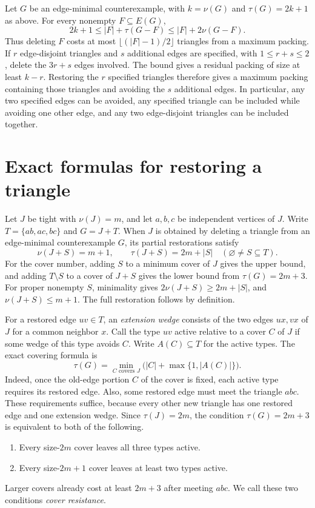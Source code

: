 \documentclass[11pt]{article}
\begin{document}
Let $G$ be an edge-minimal counterexample, with $k=\nu(G)$ and $\tau(G)=2k+1$ as above. For every nonempty $F\subseteq E(G)$,
\[
 2k+1\le |F|+\tau(G-F)\le |F|+2\nu(G-F).
\]
Thus deleting $F$ costs at most $\lfloor (|F|-1)/2\rfloor$ triangles from a maximum packing. If $r$ edge-disjoint triangles and $s$ additional edges are specified, with $1\le r+s\le2$, delete the $3r+s$ edges involved. The bound gives a residual packing of size at least $k-r$. Restoring the $r$ specified triangles therefore gives a maximum packing containing those triangles and avoiding the $s$ additional edges. In particular, any two specified edges can be avoided, any specified triangle can be included while avoiding one other edge, and any two edge-disjoint triangles can be included together.

\section{Exact formulas for restoring a triangle}

Let $J$ be tight with $\nu(J)=m$, and let $a,b,c$ be independent vertices of $J$. Write $T=\{ab,ac,bc\}$ and $G=J+T$. When $J$ is obtained by deleting a triangle from an edge-minimal counterexample $G$, its partial restorations satisfy
\[
 \nu(J+S)=m+1,\qquad \tau(J+S)=2m+|S|
 \quad(\varnothing\ne S\subseteq T).
\]
For the cover number, adding $S$ to a minimum cover of $J$ gives the upper bound, and adding $T\setminus S$ to a cover of $J+S$ gives the lower bound from $\tau(G)=2m+3$. For proper nonempty $S$, minimality gives $2\nu(J+S)\ge2m+|S|$, and $\nu(J+S)\le m+1$. The full restoration follows by definition.

For a restored edge $uv\in T$, an \emph{extension wedge} consists of the two edges $ux,vx$ of $J$ for a common neighbor $x$. Call the type $uv$ active relative to a cover $C$ of $J$ if some wedge of this type avoids $C$. Write $A(C)\subseteq T$ for the active types. The exact covering formula is
\begin{equation}\label{eq:restoration-cover}
 \tau(G)=\min_{C\text{ covers }J}\bigl(|C|+\max\{1,|A(C)|\}\bigr).
\end{equation}
Indeed, once the old-edge portion $C$ of the cover is fixed, each active type requires its restored edge. Also, some restored edge must meet the triangle $abc$. These requirements suffice, because every other new triangle has one restored edge and one extension wedge. Since $\tau(J)=2m$, the condition $\tau(G)=2m+3$ is equivalent to both of the following.
\begin{enumerate}
\item Every size-$2m$ cover leaves all three types active.
\item Every size-$2m+1$ cover leaves at least two types active.
\end{enumerate}
Larger covers already cost at least $2m+3$ after meeting $abc$. We call these two conditions \emph{cover resistance}.
\end{document}
